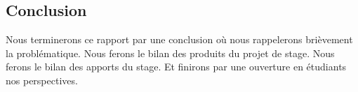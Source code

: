 \subsection{Conclusion}
Nous terminerons ce rapport par une conclusion où nous rappelerons brièvement la problématique.\newline
Nous ferons le bilan des produits du projet de stage.\newline
Nous ferons le bilan des apports du stage.\newline
Et finirons par une ouverture en étudiants nos perspectives.
